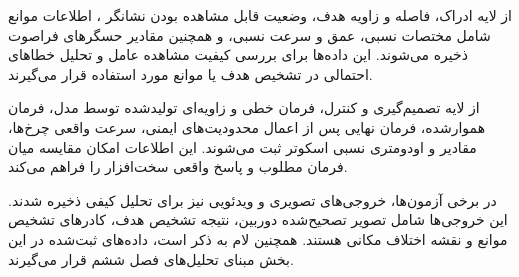 از لایه ادراک، فاصله و زاویه هدف، وضعیت قابل مشاهده بودن نشانگر ، اطلاعات موانع شامل مختصات نسبی، عمق و سرعت نسبی، و همچنین مقادیر حسگرهای فراصوت ذخیره می‌شوند. این داده‌ها برای بررسی کیفیت مشاهده عامل و تحلیل خطاهای احتمالی در تشخیص هدف یا موانع مورد استفاده قرار می‌گیرند.

از لایه تصمیم‌گیری و کنترل، فرمان خطی و زاویه‌ای تولیدشده توسط مدل، فرمان هموارشده، فرمان نهایی پس از اعمال محدودیت‌های ایمنی، سرعت واقعی چرخ‌ها، مقادیر  و اودومتری نسبی اسکوتر ثبت می‌شوند. این اطلاعات امکان مقایسه میان فرمان مطلوب و پاسخ واقعی سخت‌افزار را فراهم می‌کند.

در برخی آزمون‌ها، خروجی‌های تصویری و ویدئویی نیز برای تحلیل کیفی ذخیره شدند. این خروجی‌ها شامل تصویر تصحیح‌شده دوربین، نتیجه تشخیص هدف، کادرهای تشخیص موانع و نقشه اختلاف مکانی هستند. همچنین لام به ذکر است، داده‌های ثبت‌شده در این بخش مبنای تحلیل‌های فصل ششم قرار می‌گیرند.



